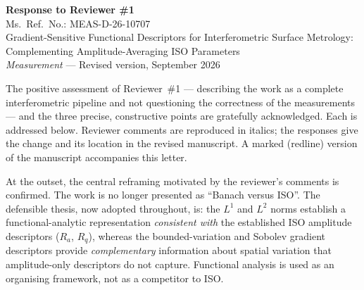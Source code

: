 \documentclass[11pt,a4paper]{article}
\begin{document}
\begin{center}
{\Large\bfseries Response to Reviewer \#1}\\[0.4em]
{\large Ms.\ Ref.\ No.: MEAS-D-26-10707}\\[0.3em]
Gradient-Sensitive Functional Descriptors for Interferometric Surface Metrology:\\
Complementing Amplitude-Averaging ISO Parameters\\[0.3em]
\textit{Measurement} --- Revised version, September 2026
\end{center}

\bigskip

The positive assessment of Reviewer~\#1 --- describing the work as a complete interferometric pipeline and not questioning the correctness of the measurements --- and the three precise, constructive points are gratefully acknowledged. Each is addressed below. Reviewer comments are reproduced in italics; the responses give the change and its location in the revised manuscript. A marked (redline) version of the manuscript accompanies this letter.

At the outset, the central reframing motivated by the reviewer's comments is confirmed. The work is no longer presented as ``Banach versus ISO''. The defensible thesis, now adopted throughout, is: the $L^1$ and $L^2$ norms establish a functional-analytic representation \emph{consistent with} the established ISO amplitude descriptors ($R_a$, $R_q$), whereas the bounded-variation and Sobolev gradient descriptors provide \emph{complementary} information about spatial variation that amplitude-only descriptors do not capture. Functional analysis is used as an organising framework, not as a competitor to ISO.
\end{document}
